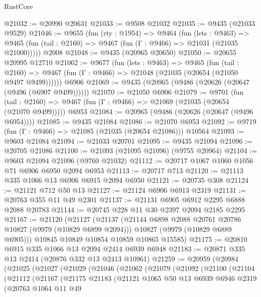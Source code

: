 \begin{lexlean}{RustCore}
\begin{coremodule}
@21032 := @20990 @20631
@21033 := @9508 @21032
@21035 := @9435 (@21033 @9529)
@21046 := @9655
    (fun (rty : @1954) =>
    @9464
      (fun (lets : @9463) =>
      @9465 (fun (tail : @2160) => @9467 (fun (Γ : @9466) => @21031 (@21035 @21000)))))
    @2008
@21048 := @9435 (@20965 @20650)
@21050 := @20655 @20995 @12710
@21062 := @9677
    (fun (lets : @9463) =>
    @9465
      (fun (tail : @2160) =>
      @9467 (fun (Γ : @9466) => @21048 (@21035 (@20654 (@21050 @9497 @9499))))))
    @6906
@21069 := @9435 (@20965 (@9486 (@20626 (@20647 (@9496 (@6907 @9499))))))
@21070 := @21050 @6906
@21079 := @9701
    (fun (tail : @2160) => @9467 (fun (Γ : @9466) => @21069 (@21035 (@20654 (@21070 @9499)))))
    @6953
@21084 := @20965 (@9486 (@20626 (@20647 (@9496 @6954))))
@21085 := @9435 @21084
@21086 := @21070 @6953
@21092 := @9719 (fun (Γ : @9466) => @21085 (@21035 (@20654 @21086))) @10564
@21093 := @9603 @21084
@21094 := @21033 @20701
@21095 := @9435 @21094
@21096 := @20705 @21086
@21100 := @21093 (@21095 @21096) (@9755 @20964)
@21104 := @9603 @21094 @21096 (@9760 @21032)
@21112 := @20717 @1067 @1060 @1056 @71 @6906 @6950 @2094 @6953
@21113 := @20717 @713
@21120 := @21113 @335 @1066 @13 @6906 @6915 @2094 @6950
@21121 := @20735 @308
@21124 := @21121 @712 @50 @13
@21127 := @21124 @6906 @6913 @2319
@21131 := @20763 @355 @11 @49 @2301
@21137 := @21131 @6905 @6912 @2295 @6888 @2088 @20783
@21144 := @20745 @228 @11 @30 @2397 @2094 @2185 @2295
@21167 := @21120
    (@21127
      (@21137
        (@21144 @6898 @2088 @20761 @20786 @10827 (@9979 (@10829 @6899 @2094)))
        @10827
        (@9979 (@10829 @6889 @6905)))
      @10845
      @10849
      @10854
      @10859
      @10865
      @15585)
@21175 := @20810 @6915 @335 @1066 @13 @2094 @2414 @6939 @6948
@21183 := @20871 @335 @13 @2414 (@20876 @332 @13 @2413 @10961)
@21259 := @20959
    (@20984
      (@21025
        (@21027
          (@21029
            (@21046
              (@21062
                (@21079
                  (@21092
                    (@21100
                      (@21104
                        (@21112
                          (@21167
                            (@21175
                              @21183
                              (@21121
                                @1065
                                @50
                                @13
                                @6939
                                @6946
                                @2319
                                (@20763
                                  @1064
                                  @11
                                  @49

\end{coremodule}
\end{lexlean}
